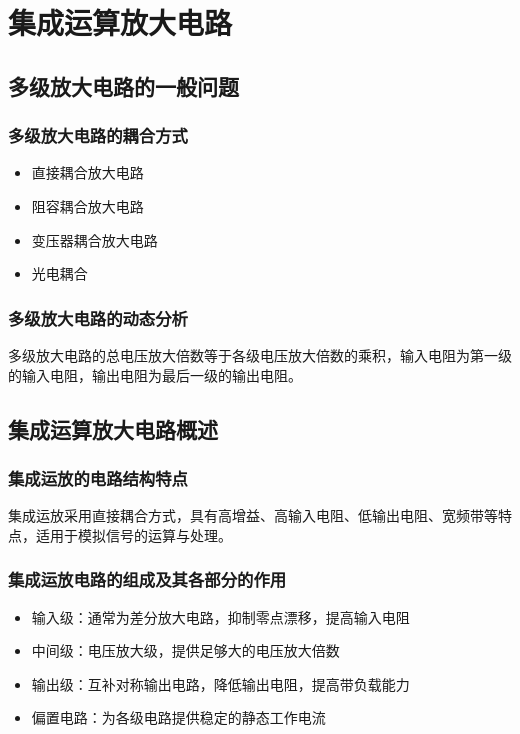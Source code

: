 \chapter{集成运算放大电路}

\section{多级放大电路的一般问题}
\subsection{多级放大电路的耦合方式}
\begin{itemize}
    \item 直接耦合放大电路
    \item 阻容耦合放大电路
    \item 变压器耦合放大电路
    \item 光电耦合
\end{itemize}

\subsection{多级放大电路的动态分析}
多级放大电路的总电压放大倍数等于各级电压放大倍数的乘积，输入电阻为第一级的输入电阻，输出电阻为最后一级的输出电阻。

\section{集成运算放大电路概述}
\subsection{集成运放的电路结构特点}
集成运放采用直接耦合方式，具有高增益、高输入电阻、低输出电阻、宽频带等特点，适用于模拟信号的运算与处理。

\subsection{集成运放电路的组成及其各部分的作用}
\begin{itemize}
    \item 输入级：通常为差分放大电路，抑制零点漂移，提高输入电阻
    \item 中间级：电压放大级，提供足够大的电压放大倍数
    \item 输出级：互补对称输出电路，降低输出电阻，提高带负载能力
    \item 偏置电路：为各级电路提供稳定的静态工作电流
\end{itemize}


